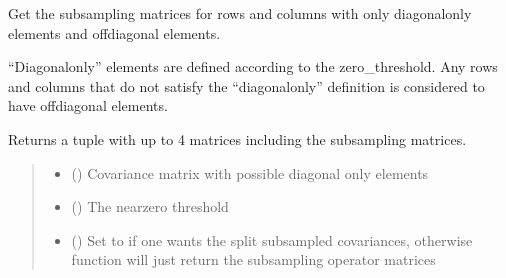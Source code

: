 \documentclass[letterpaper,10pt,english]{sphinxmanual}
\begin{document}
\begin{fulllineitems}
\label{\detokenize{kalman:glomar_gridding.autoregressive_kalman.cov_diagonal.diag_and_nondiag_rows_subsampler}}
\pysigstartsignatures
\pysiglinewithargsret
{}
{\sphinxparamcomma {}\sphinxparamcomma {}}
{}
\pysigstopsignatures
\sphinxAtStartPar
Get the subsampling matrices for rows and columns with
only diagonal\sphinxhyphen{}only elements and off\sphinxhyphen{}diagonal elements.

\sphinxAtStartPar
“Diagonal\sphinxhyphen{}only” elements are defined according to the zero\_threshold.
Any rows and columns that do not satisfy the “diagonal\sphinxhyphen{}only” definition
is considered to have off\sphinxhyphen{}diagonal elements.

\sphinxAtStartPar
Returns a tuple with up to 4 matrices including the subsampling
matrices.
\begin{quote}\begin{description}
\begin{itemize}
\item {}
\sphinxAtStartPar
{} () \textendash{} Covariance matrix with possible diagonal only elements

\item {}
\sphinxAtStartPar
{} () \textendash{} The near\sphinxhyphen{}zero threshold

\item {}
\sphinxAtStartPar
{} () \textendash{} Set to  if one wants the split subsampled covariances,
otherwise function will just return the subsampling operator matrices

\end{itemize}

\sphinxAtStartPar
{}


\end{description}
\end{quote}
\end{fulllineitems}
\end{document}
